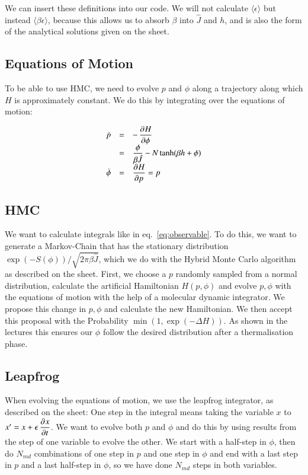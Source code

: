 \documentclass{scrartcl}
\begin{document}
We can insert these definitions into our code. We will not calculate $\langle \epsilon\rangle$ but instead $\langle \beta\epsilon\rangle$, because this allows us to absorb $\beta$ into $\hat{J}$ and $h$, and is also the form of the analytical solutions given on the sheet.



\subsection{Equations of Motion}

To be able to use HMC, we need to evolve $p$ and $\phi$ along a trajectory along which $H$ is approximately constant. We do this by integrating over the equations of motion:

\[\begin{array}{>{\displaystyle}r>{\displaystyle}c>{\displaystyle}l}
\dot{p}&=&-\dpd{H}{\phi}\\
&=&\frac{\phi}{\beta \hat{J}}-N\tanh(\beta h+\phi)\\
\dot{\phi}&=&\dpd{H}{p}=p
\end{array}\]

\subsection{HMC}

We want to calculate integrals like in eq.~\ref{eq:observable}. To do this, we want to generate  a Markov-Chain that has the stationary distribution $\exp(-S(\phi))/\sqrt{2\pi\beta\hat{J}}$, which we do with the Hybrid Monte Carlo algorithm as described on the sheet. First, we choose a $p$ randomly sampled from a normal distribution, calculate the artificial Hamiltonian $H(p, \phi)$ and evolve $p, \phi$ with the equations of motion with the help of a molecular dynamic integrator. We propose this change in $p,\phi$ and calculate the new Hamiltonian. We then accept this proposal with the Probability $\min(1, \exp(-\Delta H))$. As shown in the lectures this ensures our $\phi$ follow the desired distribution after a thermalisation phase.

\subsection{Leapfrog}

When evolving the equations of motion, we use the leapfrog integrator, as described on the sheet: One step in the integral means taking the variable $x$ to $x'=x+\epsilon\dpd{x}{t}$. We want to evolve both $p$ and $\phi$ and do this by using results from the step of one variable to evolve the other. We start with a half-step in $\phi$, then do $N_{md}$ combinations of one step in $p$ and one step in $\phi$ and end with a last step in $p$ and a last half-step in $\phi$, so we have done $N_{md}$ steps in both variables.
\end{document}
